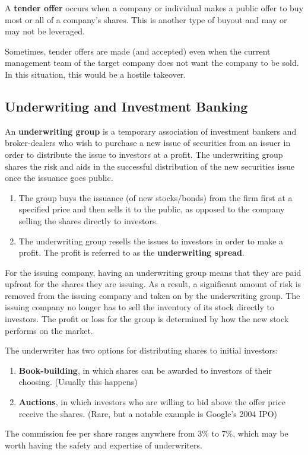 \documentclass{article}
\begin{document}
    \begin{definition}
      A \textbf{tender offer} occurs when a company or individual makes a public offer to buy most or all of a company's shares. This is another type of buyout and may or may not be leveraged. 

      Sometimes, tender offers are made (and accepted) even when the current management team of the target company does not want the company to be sold. In this situation, this would be a hostile takeover. 
    \end{definition}

  \subsection{Underwriting and Investment Banking}

    \begin{definition}[Underwriters]
    An \textbf{underwriting group} is a temporary association of investment bankers and broker-dealers who wish to purchase a new issue of securities from an issuer in order to distribute the issue to investors at a profit. The underwriting group shares the risk and aids in the successful distribution of the new securities issue once the issuance goes public. 
    \begin{enumerate}
        \item The group buys the issuance (of new stocks/bonds) from the firm first at a specified price and then sells it to the public, as opposed to the company selling the shares directly to investors. 
        \item The underwriting group resells the issues to investors in order to make a profit. The profit is referred to as the \textbf{underwriting spread}. 
    \end{enumerate}
    For the issuing company, having an underwriting group means that they are paid upfront for the shares they are issuing. As a result, a significant amount of risk is removed from the issuing company and taken on by the underwriting group. The issuing company no longer has to sell the inventory of its stock directly to investors. The profit or loss for the group is determined by how the new stock performs on the market. 

    The underwriter has two options for distributing shares to initial investors: 
    \begin{enumerate}
        \item \textbf{Book-building}, in which shares can be awarded to investors of their choosing. (Usually this happens) 
        \item \textbf{Auctions}, in which investors who are willing to bid above the offer price receive the shares. (Rare, but a notable example is Google's 2004 IPO)
    \end{enumerate}
    The commission fee per share ranges anywhere from 3\% to 7\%, which may be worth having the safety and expertise of underwriters. 
    \end{definition}
\end{document}
